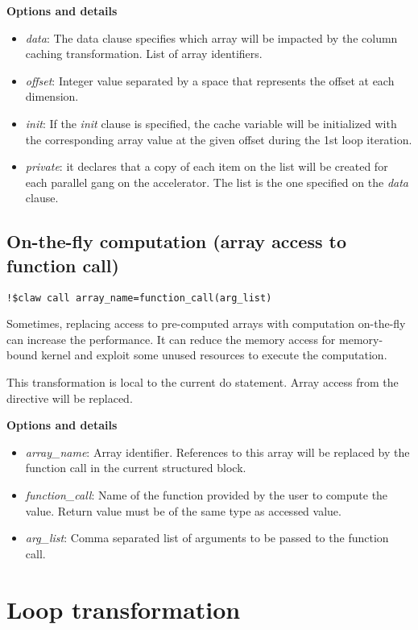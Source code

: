 \documentclass{article}
\begin{document}
\textbf{Options and details}
\begin{itemize}
\item \textit{data}: The data clause specifies which array will be impacted by the column caching transformation. List of array identifiers. 
\item \textit{offset}: Integer value separated by a space that represents the offset at each dimension. 
\item \textit{init}: If the \textit{init} clause is specified, the cache variable will be initialized with the corresponding array value at the given offset during the 1st loop iteration. 
\item \textit{private}: it declares that a copy of each item on the list will be created
for each parallel gang on the accelerator. The list is the one specified on
the \textit{data} clause.
\end{itemize}




\subsection{On-the-fly computation (array access to function call)}
\begin{lstlisting}
!$claw call array_name=function_call(arg_list)
\end{lstlisting}

Sometimes, replacing access to pre-computed arrays with computation on-the-fly
can increase the performance. It can reduce the memory access for memory-bound
kernel and exploit some unused resources to execute the computation.

This transformation is local to the current do statement. Array access from the directive will be replaced. 

\textbf{Options and details}
\begin{itemize}
\item \textit{array\_name}: Array identifier. References to this array will be replaced by the function call in the current structured block. 
\item \textit{function\_call}: Name of the function provided by the user to compute the value. Return value must be of the same type as accessed value. 
\item \textit{arg\_list}: Comma separated list of arguments to be passed to the function call. 
\end{itemize}

\section{Loop transformation}
\end{document}
